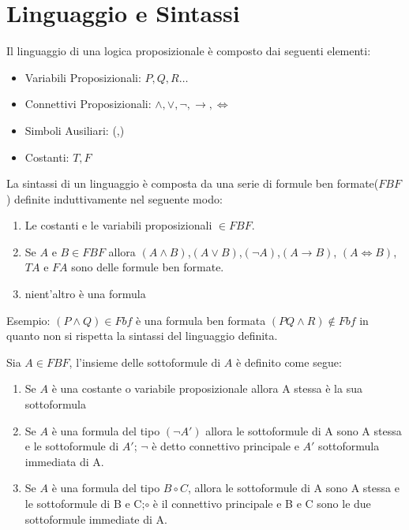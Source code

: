 \section{Linguaggio e Sintassi}
Il linguaggio di una logica proposizionale è composto dai seguenti elementi:

\begin{itemize}
  \item Variabili Proposizionali: $P,Q,R \dots$
  \item Connettivi Proposizionali: $\land, \lor, \neg, \rightarrow, \iff$
  \item Simboli Ausiliari: (,)
  \item Costanti: $T,F$
\end{itemize}

La sintassi di un linguaggio è composta da una serie di formule ben formate($FBF$) definite
induttivamente nel seguente modo:
\begin{enumerate}
  \item Le costanti e le variabili proposizionali $\in FBF$.
  \item Se $A$ e $B \in FBF$ allora $(A \land B)$,$(A \lor B)$,$(\neg A)$,$(A \rightarrow B)$,
        $(A \iff B)$,$TA$ e $FA$ sono delle formule ben formate.
  \item nient'altro è una formula
\end{enumerate}

Esempio:\newline
$(P \land Q) \in Fbf$  è una formula ben formata\newline
$(PQ \land R) \not \in Fbf$ in quanto non si rispetta la sintassi del linguaggio definita.\newline

Sia $A \in FBF$, l'insieme delle sottoformule di $A$ è definito come segue:
\begin{enumerate}
\item Se $A$ è una costante o variabile proposizionale allora A stessa è la sua sottoformula
\item Se $A$ è una formula del tipo $(\neg A')$ allora le sottoformule di A sono A stessa e le sottoformule di $A'$;
      $\neg$ è detto connettivo principale e $A'$ sottoformula immediata di A.
\item Se $A$ è una formula del tipo $B \circ C$, allora le sottoformule di A sono A stessa
      e le sottoformule di B e C;$\circ$ è il connettivo principale e B e C sono le due sottoformule immediate di A.
\end{enumerate}

